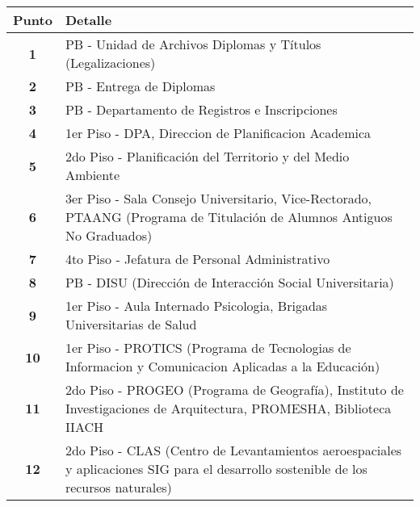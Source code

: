     \begin{longtable}{ c  X }
      \toprule
        \textbf{Punto} &
        \textbf{Detalle}\\

      \midrule
      \endhead

\textbf{1}
&
PB - Unidad de Archivos Diplomas y Títulos (Legalizaciones)
\\

\textbf{2}
&
PB - Entrega de Diplomas
\\

\textbf{3}
&
PB - Departamento de Registros e Inscripciones
\\

\textbf{4}
&
1{\tiny er} Piso - DPA, Direccion de Planificacion Academica
\\


\textbf{5}
&
2{\tiny do} Piso - Planificación del Territorio y del Medio Ambiente
\\


\textbf{6}
&
3{\tiny er} Piso - Sala Consejo Universitario, Vice-Rectorado, PTAANG (Programa de Titulación de Alumnos Antiguos No Graduados)
\\


\textbf{7}
&
4{\tiny to} Piso - Jefatura de Personal Administrativo
\\


  \textbf{8}
  &
  PB - DISU (Dirección de Interacción Social Universitaria)
  \\


\textbf{9}
&
1{\tiny er} Piso - Aula Internado Psicologia, Brigadas Universitarias de Salud
\\


\textbf{10}
&
1{\tiny er} Piso - PROTICS (Programa de Tecnologias de Informacion y Comunicacion Aplicadas a la Educación)
\\


\textbf{11}
&
2{\tiny do} Piso - PROGEO (Programa de Geografía), Instituto de Investigaciones de Arquitectura, PROMESHA, Biblioteca IIACH
\\

\textbf{12}
&
2{\tiny do} Piso - CLAS (Centro de Levantamientos aeroespaciales y aplicaciones SIG para el desarrollo sostenible de los recursos naturales)
\\



\end{longtable}
